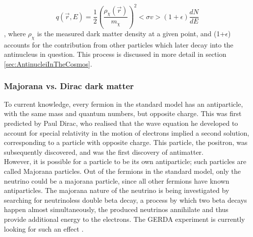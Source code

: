 \begin{equation}\label{eq:IntroDM_source_term}
    q(\vec{r}, E) = \frac{1}{2} \left( \frac{\rho_{\chi}(\vec{r})}{m_\chi}\right)^2 <\sigma v > (1+\epsilon) \frac{dN}{dE}
\end{equation}
, where $\rho_\chi$ is the measured dark matter density at a given point, and (1+$\epsilon$) accounts for the contribution from other particles which later decay into the antinucleus in question. This process is discussed in more detail in section \ref{sec:AntinucleiInTheCosmos}.


\subsubsection{Majorana vs. Dirac dark matter}\label{sec:IntroMajoranaDiracDM}
To current knowledge, every fermion in the standard model has an antiparticle, with the same mass and quantum numbers, but opposite charge. This was first predicted by Paul Dirac, who realised that the wave equation he developed to account for special relativity in the motion of electrons implied a second solution, corresponding to a particle with opposite charge\cite{Dirac}. This particle, the positron, was subsequently discovered, and was the first discovery of antimatter. \\

However, it is possible for a particle to be its own antiparticle; such particles are called Majorana particles. Out of the fermions in the standard model, only the neutrino could be a majorana particle, since all other fermions have known antiparticles. The majorana nature of the neutrino is being investigated by searching for neutrinoless double beta decay, a process by which two beta decays happen almost simultaneously, the produced neutrinos annihilate and thus provide additional energy to the electrons. The GERDA experiment is currently looking for such an effect \cite{}. \\

